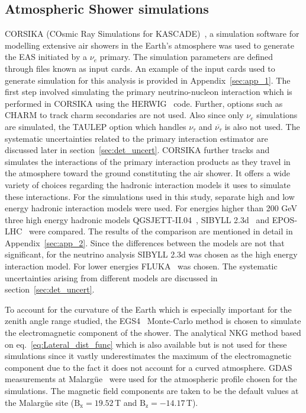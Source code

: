 \subsection{Atmospheric Shower simulations}
\label{subsec:sim_EAS}
CORSIKA (COsmic Ray Simulations for KASCADE)~\cite{Heck:1998vt}, a simulation software for modelling extensive air showers in the Earth's atmosphere was used to generate the EAS initiated by a $\nu_e$ primary. The simulation parameters are defined through files known as input cards. An example of the input cards used to generate simulation for this analysis is provided in Appendix~\ref{sec:app_1}. The first step involved simulating the primary neutrino-nucleon interaction which is performed in CORSIKA using the HERWIG~\cite{Corcella:2000bw} code. Further, options such as CHARM to track charm secondaries are not used. Also since only $\nu_e$ simulations are simulated, the TAULEP option which handles $\nu_{\tau}$ and $\overline{\nu_{\tau}}$ is also not used. The systematic uncertainties related to the primary interaction estimator are discussed later in section~\ref{sec:det_uncert}. CORSIKA further tracks and simulates the interactions of the primary interaction products as they travel in the atmosphere toward the ground constituting the air shower. It offers a wide variety of choices regarding the hadronic interaction models it uses to simulate these interactions. For the simulations used in this study, separate high and low energy hadronic interaction models were used. For energies higher than 200 GeV three high energy hadronic models QGSJETT-II.04~\cite{Ostapchenko:2010vb}, SIBYLL 2.3d~\cite{Riehn:2019jet} and EPOS-LHC~\cite{Pierog:2013ria} were compared. The results of the comparison are mentioned in detail in Appendix~\ref{sec:app_2}. Since the differences between the models are not that significant, for the neutrino analysis SIBYLL 2.3d was chosen as the high energy interaction model. For lower energies FLUKA~\cite{Ferrari:2005zk,Battistoni:2015epi} was chosen. The systematic uncertainties arising from different models are discussed in section~\ref{sec:det_uncert}.  

To account for the curvature of the Earth which is especially important for the zenith angle range studied, the EGS4~\cite{Nelson:1990sr} Monte-Carlo method is chosen to simulate the electromagnetic component of the shower. The analytical NKG method based on eq.~\ref{eq:Lateral_dist_func} which is also available but is not used for these simulations since it vastly underestimates the maximum of the electromagnetic component due to the fact it does not account for a curved atmosphere. \gls{GDAS} measurements at Malargüe~\cite{PierreAuger:2012jsu} were used for the atmospheric profile chosen for the simulations. The magnetic field components are taken to be the default values at the Malargüe site ($\mathrm{B_x = 19.52\,}$\textmu T and $\mathrm{B_z = -14.17 \,}$\textmu T). 

